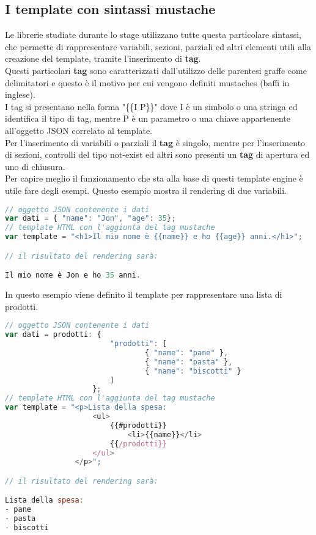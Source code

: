 \subsection{I template con sintassi mustache}
Le librerie studiate durante lo stage utilizzano tutte questa particolare sintassi, che permette di rappresentare variabili, sezioni, parziali ed altri elementi utili alla creazione del template, tramite l'inserimento di \textbf{tag}.\\
Questi particolari \textbf{tag} sono caratterizzati dall'utilizzo delle parentesi graffe come delimitatori e questo è il motivo per cui vengono definiti mustaches (baffi in inglese).\\
I tag si presentano nella forma "\{\{I P\}\}" dove I è un simbolo o una stringa ed identifica il tipo di tag, mentre P è un parametro o una chiave appartenente all'oggetto JSON correlato al template.\\
Per l'inserimento di variabili o parziali il \textbf{tag} è singolo, mentre per l'inserimento di sezioni, controlli del tipo not-exist ed altri sono presenti un \textbf{tag} di apertura ed uno di chiusura.\\
Per capire meglio il funzionamento che sta alla base di questi template engine è utile fare degli esempi.
\newpage
Questo esempio mostra il rendering di due variabili.
\begin{lstlisting}[language=JavaScript, caption=Esempio di template rappresentante una variabile.]
// oggetto JSON contenente i dati
var dati = { "name": "Jon", "age": 35};
// template HTML con l'aggiunta del tag mustache
var template = "<h1>Il mio nome è {{name}} e ho {{age}} anni.</h1>";

// il risultato del rendering sarà:

Il mio nome è Jon e ho 35 anni.
\end{lstlisting}
In questo esempio viene definito il template per rappresentare una lista di prodotti.
\begin{lstlisting}[language=JavaScript, caption=Esempio di template rappresentante una sezione.]
// oggetto JSON contenente i dati
var dati = prodotti: { 
						"prodotti": [
    							{ "name": "pane" },
    							{ "name": "pasta" },
    							{ "name": "biscotti" }
  						]
					};
// template HTML con l'aggiunta del tag mustache
var template = "<p>Lista della spesa:
					<ul>
						{{#prodotti}}
							<li>{{name}}</li>
						{{/prodotti}}
					</ul>
				</p>";

// il risultato del rendering sarà:

Lista della spesa:
- pane
- pasta
- biscotti
\end{lstlisting}

